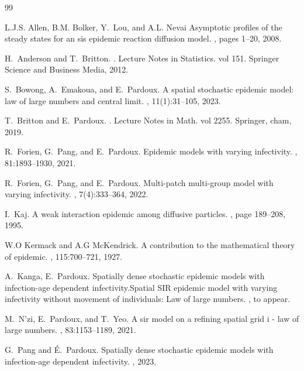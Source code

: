 \documentclass[notitlepage,reqno,11pt]{amsart}
\numberwithin{equation}{section}
\begin{document}
\begin{thebibliography}{99}

L.J.S. Allen, B.M. Bolker, Y.~Lou, and A.L. Nevai
\newblock  Asymptotic profiles of the steady states for an sis epidemic
  reaction diffusion model.
, pages 1--20, 2008.

H.~Anderson and T.~Britton.
.
\newblock Lecture Notes in Statistics. vol 151. Springer Science and Business
  Media, 2012.

S.~Bowong, A.~Emakoua, and E.~Pardoux.
\newblock A spatial stochastic epidemic model: law of large numbers and central
  limit.
, 11(1):31--105, 2023.

T.~Britton and E.~Pardoux.
.
\newblock Lecture Notes in Math. vol 2255. Springer, cham, 2019.

R.~Forien, G.~Pang, and E.~Pardoux.
\newblock Epidemic models with varying infectivity.
, 81:1893--1930, 2021.

R.~Forien, G.~Pang, and E.~Pardoux.
\newblock Multi-patch multi-group model with varying infectivity.
, 7(4):333--364, 2022.

I.~Kaj.
\newblock A weak interaction epidemic among diffusive particles.
, page 189–208,
  1995.

W.O Kermack and A.G McKendrick.
\newblock A contribution to the mathematical theory of epidemic.
, 115:700--721, 1927.


A.~Kanga, E.~Pardoux.
\newblock Spatially dense stochastic epidemic models with infection-age
  dependent infectivity.Spatial SIR epidemic model with varying infectivity without movement of individuals: Law of large numbers.
  , to appear.

M.~N’zi, E.~Pardoux, and T.~Yeo.
\newblock A sir model on a refining spatial grid i - law of large numbers.
, 83:1153--1189, 2021.

G.~Pang and {\'E}.~Pardoux.
\newblock Spatially dense stochastic epidemic models with infection-age
  dependent infectivity.
, 2023.


\end{thebibliography}
\end{document}

